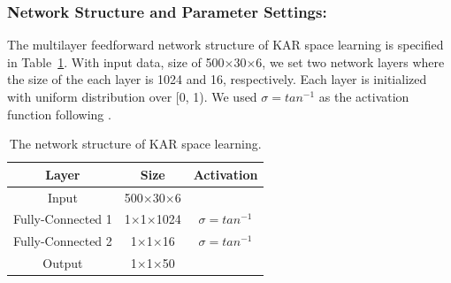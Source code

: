 \documentclass[sigconf]{acmart}
\begin{document}
\subsubsection{Network Structure and Parameter Settings:}
The multilayer feedforward network structure of KAR space learning is specified in Table~\ref{tab2}. With input data, size of 500$\times$30$\times$6, we set two network layers where the size of the each layer is 1024 and 16, respectively. Each layer is initialized with uniform distribution over [0, 1). We used $\sigma = {tan}^{-1}$ as the activation function following \cite{toh2018analytic}.
\begin{table}
    \caption{The network structure of KAR space learning.}
    \label{tab2}
    \begin{tabular}{ccc}
     \toprule
     Layer   & Size     & Activation \\
     \midrule
     Input   & 500$\times$30$\times$6 &            \\
     Fully-Connected 1 & 1$\times$1$\times$1024 & $\sigma = {tan}^{-1}$     \\
     Fully-Connected 2 & 1$\times$1$\times$16  & $\sigma = {tan}^{-1}$     \\
     Output  & 1$\times$1$\times$50   &            \\
     \bottomrule
    \end{tabular}
\end{table}
\end{document}

